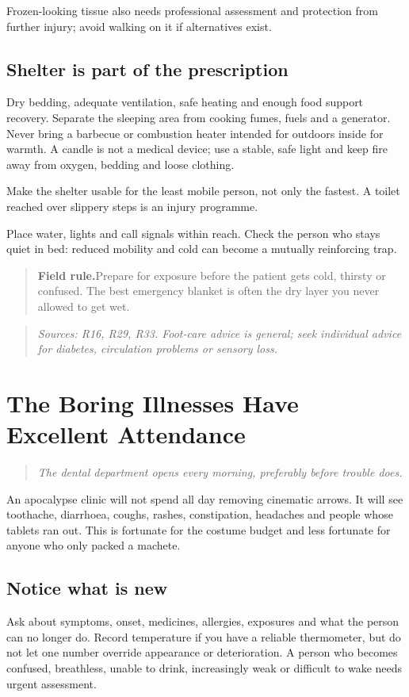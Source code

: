 \documentclass[10pt,openright]{book}
\newcommand{\fieldrule}[1]{\begin{quote}\textbf{Field rule.}\enspace #1\end{quote}}
\begin{document}
Frozen-looking tissue also needs professional assessment and protection from further injury; avoid walking on it if alternatives exist.

\section*{Shelter is part of the prescription}
Dry bedding, adequate ventilation, safe heating and enough food support recovery. Separate the sleeping area from cooking fumes, fuels and a generator. Never bring a barbecue or combustion heater intended for outdoors inside for warmth. A candle is not a medical device; use a stable, safe light and keep fire away from oxygen, bedding and loose clothing.

Make the shelter usable for the least mobile person, not only the fastest. A toilet reached over slippery steps is an injury programme.

Place water, lights and call signals within reach. Check the person who stays quiet in bed: reduced mobility and cold can become a mutually reinforcing trap.

\fieldrule{Prepare for exposure before the patient gets cold, thirsty or confused. The best emergency blanket is often the dry layer you never allowed to get wet.}
\begin{quote}\emph{Sources: R16, R29, R33. Foot-care advice is general; seek individual advice for diabetes, circulation problems or sensory loss.}\end{quote}

\chapter{The Boring Illnesses Have Excellent Attendance}
\begin{quote}\emph{The dental department opens every morning, preferably before trouble does.}\end{quote}
An apocalypse clinic will not spend all day removing cinematic arrows. It will see toothache, diarrhoea, coughs, rashes, constipation, headaches and people whose tablets ran out. This is fortunate for the costume budget and less fortunate for anyone who only packed a machete.

\section*{Notice what is new}
Ask about symptoms, onset, medicines, allergies, exposures and what the person can no longer do. Record temperature if you have a reliable thermometer, but do not let one number override appearance or deterioration. A person who becomes confused, breathless, unable to drink, increasingly weak or difficult to wake needs urgent assessment.
\end{document}
